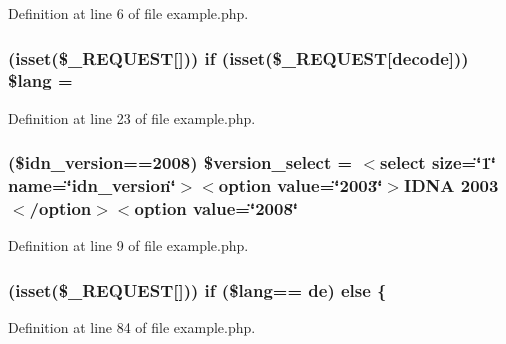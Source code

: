 Definition at line 6 of file example.\+php.

\subsubsection[{\texorpdfstring{\$lang}{$lang}}]{ (isset(\$\+\_\+\+R\+E\+Q\+U\+E\+ST\mbox{[}\textquotesingle{}\mbox{]})) {\bf if} (isset(\$\+\_\+\+R\+E\+Q\+U\+E\+ST\mbox{[}\textquotesingle{}decode\textquotesingle{}\mbox{]})) \${\bf lang} = \textquotesingle{}}\hypertarget{example_8php_aef99014231eb219a8c774eb4b8463fd9}{}\label{example_8php_aef99014231eb219a8c774eb4b8463fd9}


Definition at line 23 of file example.\+php.

\subsubsection[{\texorpdfstring{\$version\+\_\+select}{$version_select}}]{ (\$idn\+\_\+version==2008) \$version\+\_\+select = \textquotesingle{}$<$select {\bf size}=\char`\"{}1\char`\"{} {\bf name}=\char`\"{}idn\+\_\+version\char`\"{}$>$$<$option {\bf value}=\char`\"{}2003\char`\"{}$>${\bf I\+D\+NA} 2003$<$/option$>$$<$option {\bf value}=\char`\"{}2008\char`\"{}\textquotesingle{}}\hypertarget{example_8php_a13d9753a348e3a016c3d8fb1ac173bbd}{}\label{example_8php_a13d9753a348e3a016c3d8fb1ac173bbd}


Definition at line 9 of file example.\+php.

\subsubsection[{\texorpdfstring{else}{else}}]{ (isset(\$\+\_\+\+R\+E\+Q\+U\+E\+ST\mbox{[}\textquotesingle{}\mbox{]})) {\bf if} (\${\bf lang}== \textquotesingle{}de\textquotesingle{}) else \{}\hypertarget{example_8php_a62bf8b36de1aa08b54e9822dc49899aa}{}\label{example_8php_a62bf8b36de1aa08b54e9822dc49899aa}


Definition at line 84 of file example.\+php.

